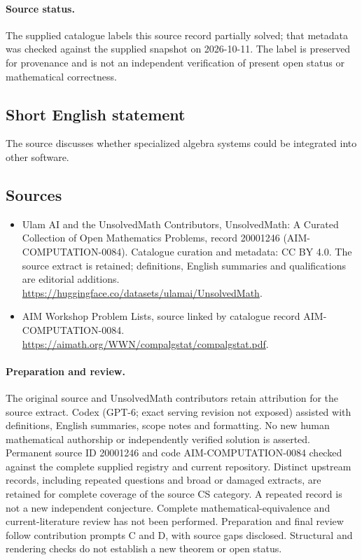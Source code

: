 \documentclass[11pt]{article}
\begin{document}
\paragraph{Source status.}
The supplied catalogue labels this source record partially solved; that metadata was checked against the supplied snapshot on 2026-10-11. The label is preserved for provenance and is not an independent verification of present open status or mathematical correctness.
\subsection{Short English statement}
The source discusses whether specialized algebra systems could be integrated into other software.
\subsection{Sources}
\begin{itemize}
\item[\hypertarget{source:20001246:1}{S1}] Ulam AI and the UnsolvedMath Contributors, UnsolvedMath: A Curated Collection of Open Mathematics Problems, record 20001246 (AIM-COMPUTATION-0084). Catalogue curation and metadata: CC BY 4.0. The source extract is retained; definitions, English summaries and qualifications are editorial additions.
\url{https://huggingface.co/datasets/ulamai/UnsolvedMath}.
\item[\hypertarget{source:20001246:2}{S2}] AIM Workshop Problem Lists, source linked by catalogue record AIM-COMPUTATION-0084.
\url{https://aimath.org/WWN/compalgstat/compalgstat.pdf}.
\end{itemize}
\paragraph{Preparation and review.}
The original source and UnsolvedMath contributors retain attribution for the source extract. Codex (GPT-6; exact serving revision not exposed) assisted with definitions, English summaries, scope notes and formatting. No new human mathematical authorship or independently verified solution is asserted. Permanent source ID 20001246 and code AIM-COMPUTATION-0084 checked against the complete supplied registry and current repository. Distinct upstream records, including repeated questions and broad or damaged extracts, are retained for complete coverage of the source CS category. A repeated record is not a new independent conjecture. Complete mathematical-equivalence and current-literature review has not been performed. Preparation and final review follow contribution prompts C and D, with source gaps disclosed. Structural and rendering checks do not establish a new theorem or open status.
\label{end:20001246}
\end{document}
